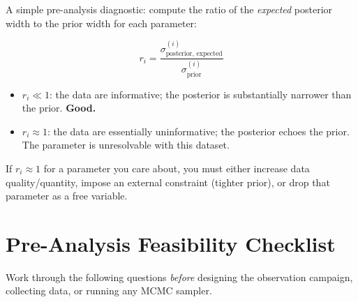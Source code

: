 \documentclass[11pt, a4paper]{article}
\begin{document}
A simple pre-analysis diagnostic: compute the ratio of the \emph{expected} posterior
width to the prior width for each parameter:

\begin{equation}
    r_i = \frac{\sigma_\mathrm{posterior, \, expected}^{(i)}}{\sigma_\mathrm{prior}^{(i)}}
\end{equation}

\begin{itemize}[noitemsep]
    \item $r_i \ll 1$: the data are informative; the posterior is substantially
          narrower than the prior. \textbf{Good.}
    \item $r_i \approx 1$: the data are essentially uninformative; the posterior
          echoes the prior. The parameter is unresolvable with this dataset.
\end{itemize}

If $r_i \approx 1$ for a parameter you care about, you must either increase data
quality/quantity, impose an external constraint (tighter prior), or drop that
parameter as a free variable.


\section{Pre-Analysis Feasibility Checklist}

Work through the following questions \textit{before} designing the observation campaign,
collecting data, or running any MCMC sampler.
\end{document}
